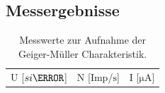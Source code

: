 \subsection{Messergebnisse}
\begin{table}
  \label{tab:Messwerte}
  \centering
  \caption{Messwerte zur Aufnahme der Geiger-Müller Charakteristik.}
  \begin{tabular}{c c c}
      \toprule
      {U [$si{\volt}$]} & {N [Imp/$\si{\second}$]} & {I [$\si{\micro\ampere}$]}
      \midrule
      
      \bottomrule
    \end{tabular}
\end{table}